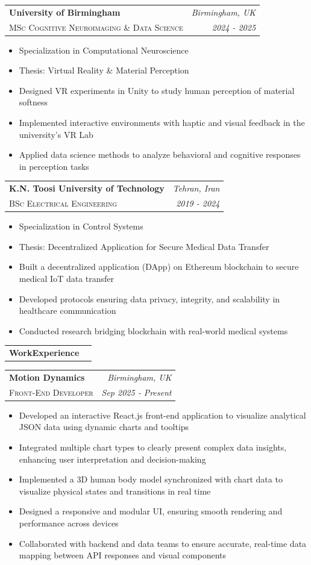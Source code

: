 \documentclass[12pt,a4paper]{article}
\makeatletter
\newcommand{\sectiontitle}[2]{%
  \vspace{0.88em}%
  \noindent\begin{tabularx}{\textwidth}{@{}l@{\hspace{0.45em}}X@{}}
    {\sffamily\bfseries\fontsize{18.5}{22.5}\selectfont\textcolor{awesome-red}{#1}\textcolor{text-dark}{#2}} &
    \raisebox{0.75ex}{\makebox[\linewidth]{\color{rule-gray}\leaders\hrule height 0.45pt\hfill\kern0pt}}\tabularnewline[-0.35em]
  \end{tabularx}%
  \vspace{0.24em}%
}
\newcommand{\entrytitle}[1]{{\sffamily\bfseries\fontsize{13.2}{16}\selectfont\color{text-dark}#1}}
\newcommand{\entrystyle}[1]{{\sffamily\fontsize{10.2}{12.2}\selectfont\scshape\color{text-dark}#1}}
\newcommand{\where}[1]{{\itshape\fontsize{9.2}{11}\selectfont\color{awesome-red}#1}}
\newcommand{\when}[1]{{\itshape\fontsize{8.5}{10.2}\selectfont\color{light-gray}#1}}
\newenvironment{cvitems}{%
  \begin{itemize}[leftmargin=1.15em,label={\fontsize{5.5}{5.5}\selectfont\textbullet},topsep=0.28em,itemsep=0.24em,parsep=0.05em,partopsep=0pt]
    \fontsize{10}{12.4}\selectfont\color{text-gray}%
}{\end{itemize}}
\newcommand{\cventry}[5]{%
  \noindent\begin{tabularx}{\textwidth}{@{}Xr@{}}
    \entrytitle{#1} & \where{#2} \\
    \entrystyle{#3} & \when{#4}
  \end{tabularx}%
  \vspace{-0.42em}%
  #5%
  \vspace{0.42em}%
}
\makeatother
\begin{document}
\cventry{University of Birmingham}{Birmingham, UK}{MSc Cognitive Neuroimaging \& Data Science}{2024 - 2025}{%
\begin{cvitems}
  \item Specialization in Computational Neuroscience
  \item Thesis: Virtual Reality \& Material Perception
  \item Designed VR experiments in Unity to study human perception of material softness
  \item Implemented interactive environments with haptic and visual feedback in the university's VR Lab
  \item Applied data science methods to analyze behavioral and cognitive responses in perception tasks
\end{cvitems}}

\cventry{K.N. Toosi University of Technology}{Tehran, Iran}{BSc Electrical Engineering}{2019 - 2024}{%
\begin{cvitems}
  \item Specialization in Control Systems
  \item Thesis: Decentralized Application for Secure Medical Data Transfer
  \item Built a decentralized application (DApp) on Ethereum blockchain to secure medical IoT data transfer
  \item Developed protocols ensuring data privacy, integrity, and scalability in healthcare communication
  \item Conducted research bridging blockchain with real-world medical systems
\end{cvitems}}

\newpage

\sectiontitle{Work}{Experience}

\cventry{Motion Dynamics}{Birmingham, UK}{Front-End Developer}{Sep 2025 - Present}{%
\begin{cvitems}
  \item Developed an interactive React.js front-end application to visualize analytical JSON data using dynamic charts and tooltips
  \item Integrated multiple chart types to clearly present complex data insights, enhancing user interpretation and decision-making
  \item Implemented a 3D human body model synchronized with chart data to visualize physical states and transitions in real time
  \item Designed a responsive and modular UI, ensuring smooth rendering and performance across devices
  \item Collaborated with backend and data teams to ensure accurate, real-time data mapping between API responses and visual components
\end{cvitems}}
\end{document}
